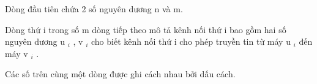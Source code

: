 Dòng đầu tiên chứa 2 số nguyên dương n và m.

Dòng thứ i trong số m dòng tiếp theo mô tả kênh nối thứ i bao gồm hai số nguyên dương u­ $_ i $ , v $_ i $ cho biết kênh nối thứ i cho phép truyền tin từ máy u $_ i $ đến máy v $_ i $ .

Các số trên cùng một dòng được ghi cách nhau bởi dấu cách.
